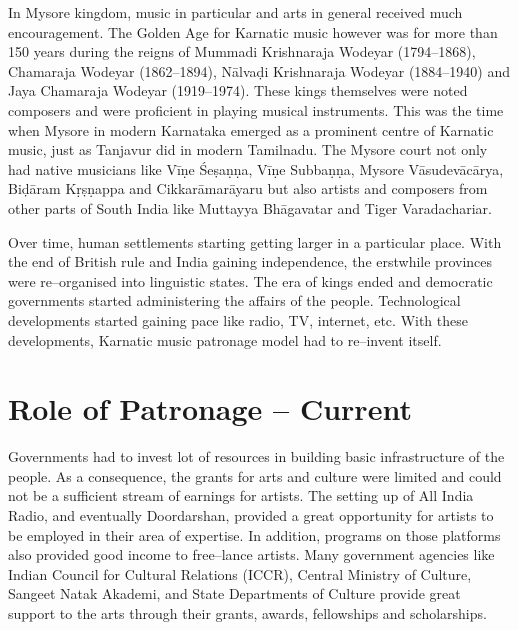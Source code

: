 In Mysore kingdom, music in particular and arts in general received much encouragement. The Golden Age for Karnatic music however was for more than 150 years during the reigns of Mummadi Krishnaraja Wodeyar (1794–1868), Chamaraja Wodeyar (1862–1894), Nālvaḍi Krishnaraja Wodeyar (1884–1940) and Jaya Chamaraja Wodeyar (1919–1974). These kings themselves were noted composers and were proficient in playing musical instruments. This was the time when Mysore in modern Karnataka emerged as a prominent centre of Karnatic music, just as Tanjavur did in modern Tamilnadu. The Mysore court not only had native musicians like Vīṇe Śeṣaṇṇa, Vīṇe Subbaṇṇa, Mysore Vāsudevācārya, Biḍāram Kṛṣṇappa and Cikkarāmarāyaru but also artists and composers from other parts of South India like Muttayya Bhāgavatar and Tiger Varadachariar.

Over time, human settlements starting getting larger in a particular place. With the end of British rule and India gaining independence, the erstwhile provinces were re–organised into linguistic states. The era of kings ended and democratic governments started administering the affairs of the people. Technological developments started gaining pace like radio, TV, internet, etc. With these developments, Karnatic music patronage model had to re–invent itself.


\section*{Role of Patronage – Current}

Governments had to invest lot of resources in building basic infrastructure of the people. As a consequence, the grants for arts and culture were limited and could not be a sufficient stream of earnings for artists. The setting up of All India Radio, and eventually Doordarshan, provided a great opportunity for artists to be employed in their area of expertise. In addition, programs on those platforms also provided good income to free–lance artists. Many government agencies like Indian Council for Cultural Relations (ICCR), Central Ministry of Culture, Sangeet Natak Akademi, and State Departments of Culture provide great support to the arts through their grants, awards, fellowships and scholarships.

